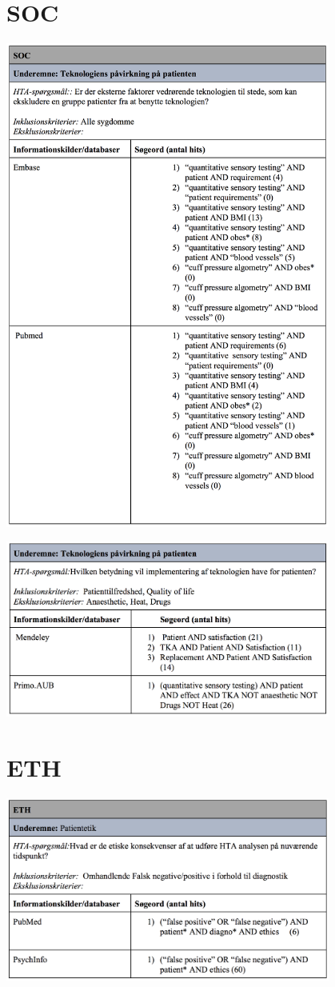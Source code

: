 \section{SOC}\label{SOC_sog}
\includegraphics[width=0.8\textwidth]{rapportAfsnit/qBilag/sogninger/SOC1}

\includegraphics[width=0.8\textwidth]{rapportAfsnit/qBilag/sogninger/SOC2}

\section{ETH}\label{ETH_sog}
\includegraphics[width=0.8\textwidth]{rapportAfsnit/qBilag/sogninger/ETH1}

